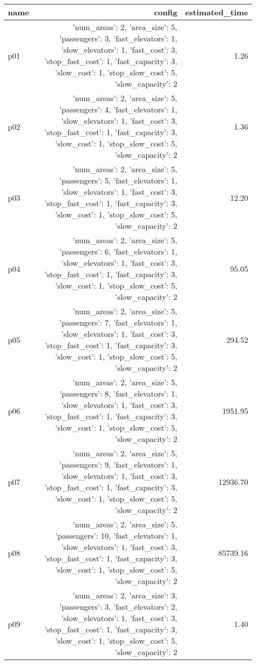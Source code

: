 \documentclass{article}
\begin{document}
                            \begin{center}
                            \scriptsize
                            \begin{tabular}{@{}l|r|r@{}}
                            name & config & estimated\_time\\\midrule
                              p01&{'num\_areas': 2, 'area\_size': 5, 'passengers': 3, 'fast\_elevators': 1, 'slow\_elevators': 1, 'fast\_cost': 3, 'stop\_fast\_cost': 1, 'fast\_capacity': 3, 'slow\_cost': 1, 'stop\_slow\_cost': 5, 'slow\_capacity': 2}&1.26\\
  p02&{'num\_areas': 2, 'area\_size': 5, 'passengers': 4, 'fast\_elevators': 1, 'slow\_elevators': 1, 'fast\_cost': 3, 'stop\_fast\_cost': 1, 'fast\_capacity': 3, 'slow\_cost': 1, 'stop\_slow\_cost': 5, 'slow\_capacity': 2}&1.36\\
  p03&{'num\_areas': 2, 'area\_size': 5, 'passengers': 5, 'fast\_elevators': 1, 'slow\_elevators': 1, 'fast\_cost': 3, 'stop\_fast\_cost': 1, 'fast\_capacity': 3, 'slow\_cost': 1, 'stop\_slow\_cost': 5, 'slow\_capacity': 2}&12.20\\
  p04&{'num\_areas': 2, 'area\_size': 5, 'passengers': 6, 'fast\_elevators': 1, 'slow\_elevators': 1, 'fast\_cost': 3, 'stop\_fast\_cost': 1, 'fast\_capacity': 3, 'slow\_cost': 1, 'stop\_slow\_cost': 5, 'slow\_capacity': 2}&95.05\\
  p05&{'num\_areas': 2, 'area\_size': 5, 'passengers': 7, 'fast\_elevators': 1, 'slow\_elevators': 1, 'fast\_cost': 3, 'stop\_fast\_cost': 1, 'fast\_capacity': 3, 'slow\_cost': 1, 'stop\_slow\_cost': 5, 'slow\_capacity': 2}&294.52\\
  p06&{'num\_areas': 2, 'area\_size': 5, 'passengers': 8, 'fast\_elevators': 1, 'slow\_elevators': 1, 'fast\_cost': 3, 'stop\_fast\_cost': 1, 'fast\_capacity': 3, 'slow\_cost': 1, 'stop\_slow\_cost': 5, 'slow\_capacity': 2}&1951.95\\
  p07&{'num\_areas': 2, 'area\_size': 5, 'passengers': 9, 'fast\_elevators': 1, 'slow\_elevators': 1, 'fast\_cost': 3, 'stop\_fast\_cost': 1, 'fast\_capacity': 3, 'slow\_cost': 1, 'stop\_slow\_cost': 5, 'slow\_capacity': 2}&12936.70\\
  p08&{'num\_areas': 2, 'area\_size': 5, 'passengers': 10, 'fast\_elevators': 1, 'slow\_elevators': 1, 'fast\_cost': 3, 'stop\_fast\_cost': 1, 'fast\_capacity': 3, 'slow\_cost': 1, 'stop\_slow\_cost': 5, 'slow\_capacity': 2}&85739.16\\
  p09&{'num\_areas': 2, 'area\_size': 3, 'passengers': 3, 'fast\_elevators': 2, 'slow\_elevators': 1, 'fast\_cost': 3, 'stop\_fast\_cost': 1, 'fast\_capacity': 3, 'slow\_cost': 1, 'stop\_slow\_cost': 5, 'slow\_capacity': 2}&1.40\\

\end{tabular}
\end{center}
\end{document}
